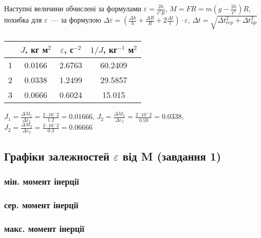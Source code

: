 \documentclass[12pt]{article}
\begin{document}
{\begin{center}
\bigskip
Наступні величини обчислені за формулами $\varepsilon = \frac{2h}{t^2 R}$,
$M=FR=m\left(g-\frac{2h}{t^2}\right)R$, похибка для $\varepsilon$~--- за
формулою $\Delta\varepsilon=\left(\frac{\Delta h}{h}+\frac{\Delta R}{R}
+2\frac{\Delta t}{t}\right)\cdot\varepsilon$, $\Delta t =
\sqrt{\Delta t^2_{cep}+\Delta t^2_{np}}$

	

\subsubsection*{}

\begin{tabular}{|c|c|c|c|}
	\hline
	\No & $J$, кг м$^2$ & $\varepsilon$, с$^{-2}$ & $1/J$, кг$^{-1}$ м$^2$ \\
	\hline
	1 & 0.0166 & 2.6763 & 60.2409 \\
	\hline
	2 & 0.0338 & 1.2499 & 29.5857\\
	\hline
	3 & 0.0666 & 0.6024 & 15.015\\
	\hline
\end{tabular}

\end{center}

$J_1=\frac{\Delta M_1}{\Delta \varepsilon_1}=\frac{2\cdot10^-2}{1.2}=0.01666$,
$J_2=\frac{\Delta M_2}{\Delta \varepsilon_2}=\frac{2\cdot10^-2}{0.59}=0.0338$,
$J_2=\frac{\Delta M_2}{\Delta \varepsilon_2}=\frac{2\cdot10^-2}{0.3}=0.06666$


}


\begin{center}
\subsection*{Графіки залежностей $\varepsilon$ від M (завдання 1)}

\subsubsection*{мін. момент інерції}



\subsubsection*{сер. момент інерції}



\subsubsection*{макс. момент інерції}



\end{center}
\end{document}
